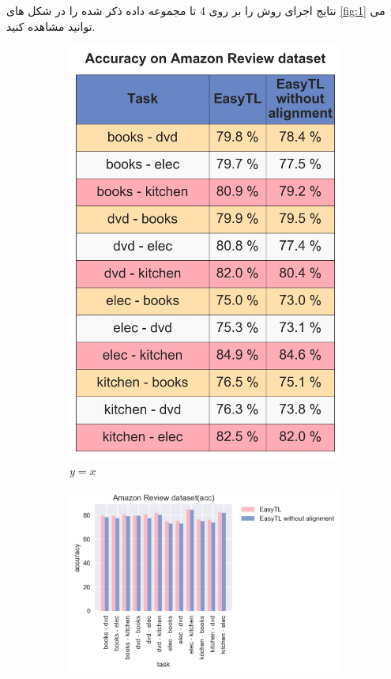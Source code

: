 نتایج اجرای روش
را بر روی 4 تا مجموعه داده ذکر شده را در شکل های
\ref{fig:1}
 می توانید مشاهده کنید.

\begin{figure}
	\centering
	\begin{subfigure}[b]{0.3\textwidth}
		\centering
		\includegraphics[width=\textwidth]{images/1_1.jpg}
		\caption{$y=x$}
		\label{fig:y equals x}
	\end{subfigure}
	\vfill
	\begin{subfigure}[b]{0.3\textwidth}
		\centering
		\includegraphics[width=\textwidth]{images/1_2.jpg}

\end{subfigure}
\end{figure}
